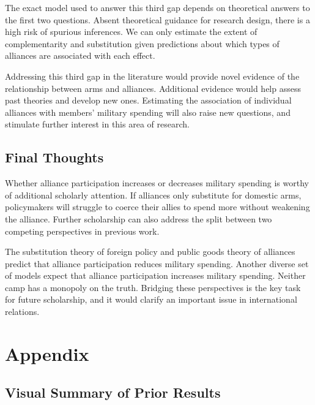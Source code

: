 \documentclass[12pt]{article}
\begin{document}
The exact model used to answer this third gap depends on theoretical answers to the first two questions. 
Absent theoretical guidance for research design, there is a high risk of spurious inferences. 
We can only estimate the extent of complementarity and substitution given predictions about which types of alliances are associated with each effect. 


Addressing this third gap in the literature would provide novel evidence of the relationship between arms and alliances. 
Additional evidence would help assess past theories and develop new ones.
Estimating the association of individual alliances with members' military spending will also raise new questions, and stimulate further interest in this area of research. 



\subsection{Final Thoughts} 

Whether alliance participation increases or decreases military spending is worthy of additional scholarly attention. 
If alliances only substitute for domestic arms, policymakers will struggle to coerce their allies to spend more without weakening the alliance. 
Further scholarship can also address the split between two competing perspectives in previous work.


The substitution theory of foreign policy and public goods theory of alliances predict that alliance participation reduces military spending. 
Another diverse set of models expect that alliance participation increases military spending. 
Neither camp has a monopoly on the truth. 
Bridging these perspectives is the key task for future scholarship, and it would clarify an important issue in international relations. 









\section*{Appendix}

\subsection*{Visual Summary of Prior Results} 
\end{document}
